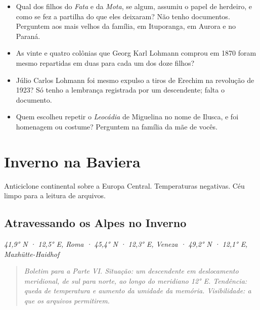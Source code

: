 \documentclass[
  brazilian,
  11pt,
  openany]{book}
\providecommand{\tightlist}{%
  \setlength{\itemsep}{0pt}\setlength{\parskip}{0pt}}
\newenvironment{boletim}{\begin{center}\begin{minipage}{0.85\linewidth}\small\itshape}{\end{minipage}\end{center}}
\begin{document}
\begin{itemize}
\tightlist
\item
  Qual dos filhos do \emph{Fata} e da \emph{Mota}, se algum, assumiu o
  papel de herdeiro, e como se fez a partilha do que eles deixaram? Não
  tenho documentos. Perguntem aos mais velhos da família, em Ituporanga,
  em Aurora e no Paraná.
\item
  As vinte e quatro colônias que Georg Karl Lohmann comprou em 1870
  foram mesmo repartidas em duas para cada um dos doze filhos?
\item
  Júlio Carlos Lohmann foi mesmo expulso a tiros de Erechim na revolução
  de 1923? Só tenho a lembrança registrada por um descendente; falta o
  documento.
\item
  Quem escolheu repetir o \emph{Leocádia} de Miguelina no nome de
  Ilusca, e foi homenagem ou costume? Perguntem na família da mãe de
  vocês.
\end{itemize}

\part{Inverno na Baviera}\label{inverno-na-baviera}

\begin{boletim}

Anticiclone continental sobre a Europa Central. Temperaturas negativas.
Céu limpo para a leitura de arquivos.

\end{boletim}

\chapter{Atravessando os Alpes no Inverno}\label{cap-16}

\emph{41,9° N · 12,5° E, Roma · 45,4° N · 12,3° E, Veneza · 49,2° N ·
12,1° E, Maxhütte-Haidhof}

\begin{quote}
\emph{Boletim para a Parte VI. Situação: um descendente em deslocamento
meridional, de sul para norte, ao longo do meridiano 12° E. Tendência:
queda de temperatura e aumento da umidade da memória. Visibilidade: a
que os arquivos permitirem.}
\end{quote}
\end{document}
